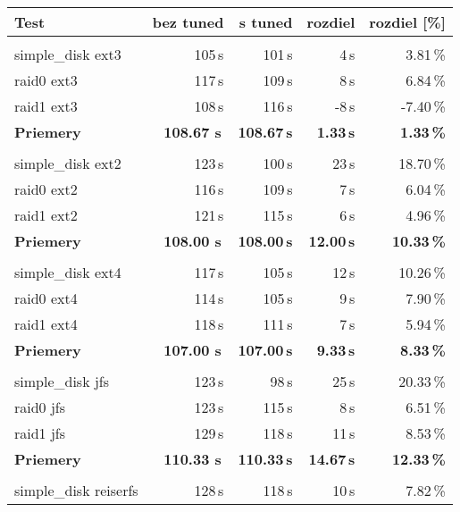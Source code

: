 {{{{{\renewcommand{\arraystretch}{1.1}
\begin{table}[H]
\begin{center}
\begin{tabular}{|l|r r r r|}
    \hline
    \textbf{Test} & \textbf{bez tuned} & \textbf{s tuned} & \textbf{rozdiel} & \textbf{rozdiel [\%]} \\
    \hline & \\[-1em]\hline
    simple\_disk ext3 & 105\,s & 101\,s & 4\,s & 3.81\,\% \\
    raid0 ext3 & 117\,s & 109\,s & 8\,s & 6.84\,\% \\
    raid1 ext3 & 108\,s & 116\,s & -8\,s & -7.40\,\% \\
    \hline
    \textbf{Priemery} & \textbf{108.67 s}\,& \textbf{108.67\,s} & \textbf{1.33\,s} & \textbf{1.33\,\%} \\
    \hline & \\[-1em]\hline
    simple\_disk ext2 & 123\,s & 100\,s & 23\,s & 18.70\,\% \\
    raid0 ext2 & 116\,s & 109\,s & 7\,s & 6.04\,\% \\
    raid1 ext2 & 121\,s & 115\,s & 6\,s & 4.96\,\% \\
    \hline
    \textbf{Priemery} & \textbf{108.00 s}\,& \textbf{108.00\,s} & \textbf{12.00\,s} & \textbf{10.33\,\%} \\
    \hline & \\[-1em]\hline
    simple\_disk ext4 & 117\,s & 105\,s & 12\,s & 10.26\,\% \\
    raid0 ext4 & 114\,s & 105\,s & 9\,s & 7.90\,\% \\
    raid1 ext4 & 118\,s & 111\,s & 7\,s & 5.94\,\% \\
    \hline
    \textbf{Priemery} & \textbf{107.00 s}\,& \textbf{107.00\,s} & \textbf{9.33\,s} & \textbf{8.33\,\%} \\
    \hline & \\[-1em]\hline
    simple\_disk jfs & 123\,s & 98\,s & 25\,s & 20.33\,\% \\
    raid0 jfs & 123\,s & 115\,s & 8\,s & 6.51\,\% \\
    raid1 jfs & 129\,s & 118\,s & 11\,s & 8.53\,\% \\
    \hline
    \textbf{Priemery} & \textbf{110.33 s}\,& \textbf{110.33\,s} & \textbf{14.67\,s} & \textbf{12.33\,\%} \\
    \hline & \\[-1em]\hline
    simple\_disk reiserfs & 128\,s & 118\,s & 10\,s & 7.82\,\% \\

\end{tabular}
\end{center}
\end{table}}}}}}

